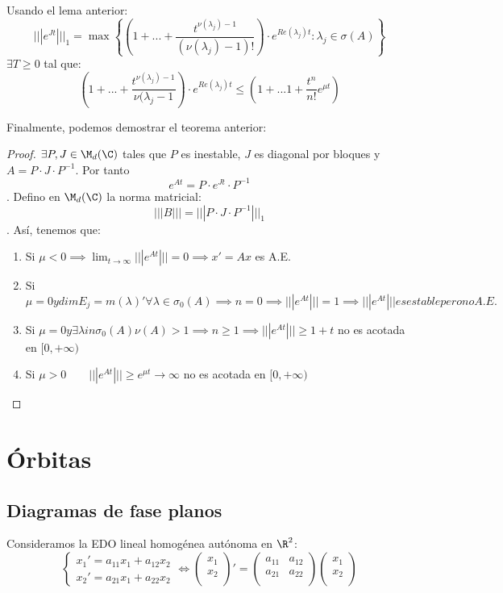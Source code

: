 Usando el lema anterior:
\begin{equation}
|||e^{Jt}|||_1=\max
\left\{ {\left(
1+...+\frac{t^{\nu(\lambda_j)-1}}{(\nu (\lambda_j)-1)!}
\right) }
\cdot e^{Re(\lambda_j)t} : \lambda_j \in \sigma(A) \right\}
\tag{cosarara}\label{cosarara}
\end{equation}
$\exists T \geq 0$ tal que:
\begin{equation}
(1+...+\frac{t^{\nu(\lambda_j)-1}}{\nu(\lambda_j - 1})\cdot e^{Re(\lambda_j)t} \leq (1+...1+\frac{t^n}{n!}e^{\mu t})
\end{equation}

Finalmente, podemos demostrar el teorema anterior:

\begin{proof}
$\exists P, J \in \M_d(\C)$ tales que $P$ es inestable, $J$ es diagonal por bloques y $A=P\cdot J \cdot P^{-1}$. Por tanto $$e^{At}=P\cdot e^{Jt} \cdot P^{-1}$$.
Defino en $\M_d(\C)$ la norma matricial:
$$|||B|||=|||P\cdot J \cdot P^{-1}|||_1$$.
Así, tenemos que:
\begin{enumerate}
\item Si $\mu < 0 \implies \lim_{t\to\infty}|||e^{At}|||=0\implies x'=Ax$ es A.E.
\item Si $\mu = 0 y dimE_j=m(\lambda)' \forall \lambda \in \sigma_0(A)\implies n=0 \implies |||e^{At}|||=1\implies|||e^{At}||| es estable pero no A.E.$
\item Si $\mu = 0 y \exists \lambda in \sigma_0(A) \nu(A)>1 \implies n\geq 1\implies |||e^{At}|||\geq 1+t$ no es acotada en $[0,+\infty)$
\item Si $\mu > 0 \qquad |||e^{At}|||\geq e^{\mu t}\to \infty$ no es acotada en $[0,+\infty)$
\end{enumerate}
\end{proof}


\section{Órbitas}
\subsection{Diagramas de fase planos}
Consideramos la EDO lineal homogénea autónoma en $\R^2$:
\begin{equation}
\left\{\begin{array}{rl}
x_1'=a_{11}x_1+a_{12}x_2 \\
x_2'=a_{21}x_1+a_{22}x_2
\end{array}\right.\Leftrightarrow
\begin{pmatrix}
x_1 \\
x_2 \\
\end{pmatrix}
'=
\begin{pmatrix}
a_{11} & a_{12} \\
a_{21} & a_{22} \\
\end{pmatrix}
\begin{pmatrix}
x_1 \\
x_2 \\
\end{pmatrix}
\end{equation}

